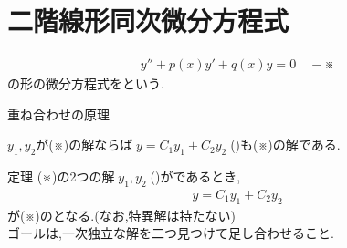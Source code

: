 \documentclass[a4paper]{jsarticle}
\begin{document}
\section{二階線形同次微分方程式}
\begin{eqnarray*}
    y''+p\left(x\right)y'+q\left(x\right)y=0\quad -※
\end{eqnarray*}
の形の微分方程式をという.
\begin{itembox}[l]{重ね合わせの原理}
    \begin{center}
        $y_1,y_2$が(※)の解ならば$\; y=C_1y_1+C_2y_2\;$()も(※)の解である.
    \end{center}
\end{itembox}
\begin{itembox}[l]{定理}
    (※)の2つの解$\;y_1,y_2\;$()がであるとき,
    \begin{eqnarray*}
        y=C_1y_1+C_2y_2
    \end{eqnarray*}
    が(※)のとなる.(なお,特異解は持たない)\\
    ゴールは,一次独立な解を二つ見つけて足し合わせること.
\end{itembox}
\end{document}
